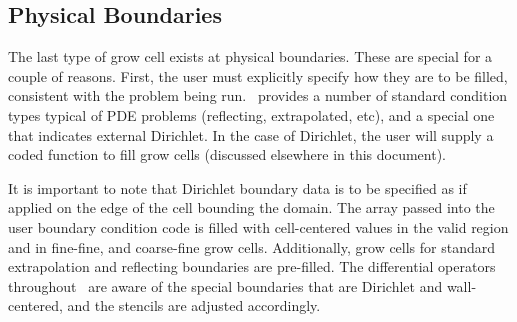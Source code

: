 \subsection{Physical Boundaries}
The last type of grow cell exists at physical boundaries.  These are special for 
a couple of reasons.  First, the user must explicitly specify how they are to be
filled, consistent with the problem being run.  \amrex\ provides a number of 
standard condition types typical of PDE problems (reflecting, extrapolated, etc),
and a special one that indicates external Dirichlet. In the case of Dirichlet,
the user will supply a coded function to fill grow cells (discussed elsewhere in
this document).

It is important to note that Dirichlet boundary data is to be specified as 
if applied on the edge of the cell bounding the domain. The array passed into the 
user boundary condition code is filled with cell-centered values in the valid 
region and in fine-fine, and coarse-fine grow cells.  Additionally, grow cells 
for standard extrapolation and reflecting boundaries are pre-filled.  The 
differential operators throughout \iamr\ are aware of the special boundaries
that are Dirichlet and wall-centered, and the stencils are adjusted accordingly.

